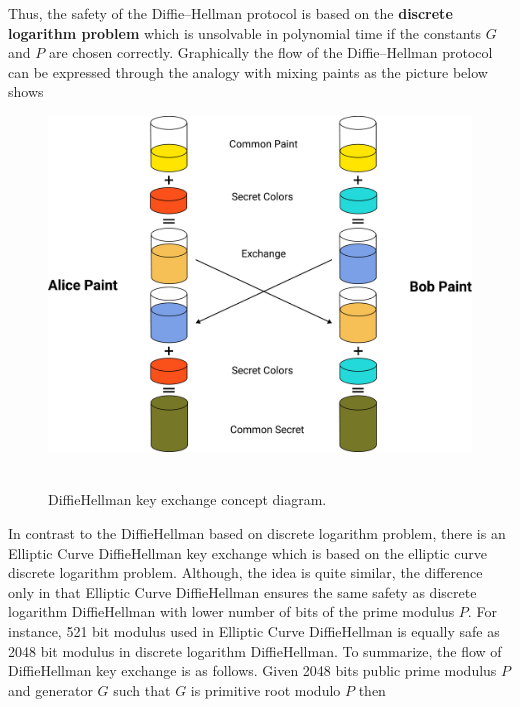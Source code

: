 Thus, the safety of the Diffie--Hellman protocol is based on the \textbf{discrete logarithm problem} which is unsolvable
in polynomial time if the constants $G$ and $P$ are chosen correctly.
Graphically the flow of the Diffie--Hellman protocol can be expressed through the
analogy with mixing paints as the picture below shows
\begin{figure}[H]
    \centering
    \includegraphics[width=1\textwidth]{Pictures/Diffie_Hellman_keyexchange_concept_diagram}
    ~\caption{Diffie\textendash Hellman key exchange concept diagram.}\label{fig:figure4}
\end{figure}
In contrast to the Diffie\textendash Hellman based on discrete logarithm problem,
there is an Elliptic Curve Diffie\textendash Hellman key exchange which is based on the elliptic curve discrete logarithm problem.
Although, the idea is quite similar, the difference only in that Elliptic Curve Diffie\textendash Hellman ensures the same safety
as discrete logarithm Diffie\textendash Hellman with lower number of bits of the prime modulus $P$.
For instance, 521 bit modulus used in Elliptic Curve Diffie\textendash Hellman is equally safe as 2048 bit modulus in
discrete logarithm Diffie\textendash Hellman.
To summarize, the flow of Diffie\textendash Hellman key exchange is as follows.
Given 2048 bits public prime modulus $P$ and generator $G$ such that $G$ is primitive root modulo $P$ then
